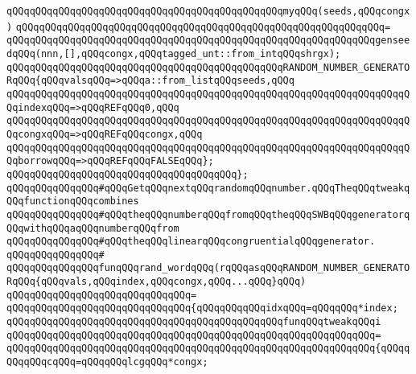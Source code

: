 \verb|qQQqqQQqqQQqqQQqqQQqqQQqqQQqqQQqqQQqqQQqqQQqqQQqmyqQQq(seeds,qQQqcongx)|\newline
\verb|qQQqqQQqqQQqqQQqqQQqqQQqqQQqqQQqqQQqqQQqqQQqqQQqqQQqqQQqqQQqqQQq=|\newline
\verb|qQQqqQQqqQQqqQQqqQQqqQQqqQQqqQQqqQQqqQQqqQQqqQQqqQQqqQQqqQQqqQQqgenseedqQQq(nnn,[],qQQqcongx,qQQqtagged_unt::from_intqQQqshrgx);|\newline
\newline
\verb|qQQqqQQqqQQqqQQqqQQqqQQqqQQqqQQqqQQqqQQqqQQqqQQqRANDOM_NUMBER_GENERATORqQQq{qQQqvalsqQQq=>qQQqa::from_listqQQqseeds,qQQq|\newline
\verb|qQQqqQQqqQQqqQQqqQQqqQQqqQQqqQQqqQQqqQQqqQQqqQQqqQQqqQQqqQQqqQQqqQQqqQQqindexqQQq=>qQQqREFqQQq0,qQQq|\newline
\verb|qQQqqQQqqQQqqQQqqQQqqQQqqQQqqQQqqQQqqQQqqQQqqQQqqQQqqQQqqQQqqQQqqQQqqQQqcongxqQQq=>qQQqREFqQQqcongx,qQQq|\newline
\verb|qQQqqQQqqQQqqQQqqQQqqQQqqQQqqQQqqQQqqQQqqQQqqQQqqQQqqQQqqQQqqQQqqQQqqQQqborrowqQQq=>qQQqREFqQQqFALSEqQQq};|\newline
\verb|qQQqqQQqqQQqqQQqqQQqqQQqqQQqqQQqqQQqqQQq};|\newline
\newline
\newline
\verb|qQQqqQQqqQQqqQQq#qQQqGetqQQqnextqQQqrandomqQQqnumber.qQQqTheqQQqtweakqQQqfunctionqQQqcombines|\newline
\verb|qQQqqQQqqQQqqQQq#qQQqtheqQQqnumberqQQqfromqQQqtheqQQqSWBqQQqgeneratorqQQqwithqQQqaqQQqnumberqQQqfrom|\newline
\verb|qQQqqQQqqQQqqQQq#qQQqtheqQQqlinearqQQqcongruentialqQQqgenerator.|\newline
\verb|qQQqqQQqqQQqqQQq#|\newline
\verb|qQQqqQQqqQQqqQQqfunqQQqrand_wordqQQq(rqQQqasqQQqRANDOM_NUMBER_GENERATORqQQq{qQQqvals,qQQqindex,qQQqcongx,qQQq...qQQq}qQQq)|\newline
\verb|qQQqqQQqqQQqqQQqqQQqqQQqqQQqqQQq=|\newline
\verb|qQQqqQQqqQQqqQQqqQQqqQQqqQQqqQQq{qQQqqQQqqQQqidxqQQq=qQQqqQQq*index;|\newline
\newline
\verb|qQQqqQQqqQQqqQQqqQQqqQQqqQQqqQQqqQQqqQQqqQQqqQQqfunqQQqtweakqQQqi|\newline
\verb|qQQqqQQqqQQqqQQqqQQqqQQqqQQqqQQqqQQqqQQqqQQqqQQqqQQqqQQqqQQqqQQq=|\newline
\verb|qQQqqQQqqQQqqQQqqQQqqQQqqQQqqQQqqQQqqQQqqQQqqQQqqQQqqQQqqQQqqQQq{qQQqqQQqqQQqcqQQq=qQQqqQQqlcgqQQq*congx;|\newline
